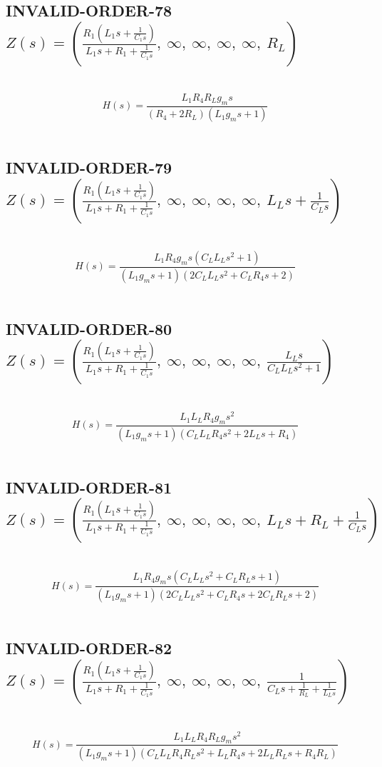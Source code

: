 \documentclass{article}
\begin{document}
\subsection{INVALID-ORDER-78 $Z(s) = \left( \frac{R_{1} \left(L_{1} s + \frac{1}{C_{1} s}\right)}{L_{1} s + R_{1} + \frac{1}{C_{1} s}}, \  \infty, \  \infty, \  \infty, \  \infty, \  R_{L}\right)$ } \ 
\textbf{\[H(s) = \frac{L_{1} R_{4} R_{L} g_{m} s}{\left(R_{4} + 2 R_{L}\right) \left(L_{1} g_{m} s + 1\right)}\] } \ 
\subsection{INVALID-ORDER-79 $Z(s) = \left( \frac{R_{1} \left(L_{1} s + \frac{1}{C_{1} s}\right)}{L_{1} s + R_{1} + \frac{1}{C_{1} s}}, \  \infty, \  \infty, \  \infty, \  \infty, \  L_{L} s + \frac{1}{C_{L} s}\right)$ } \ 
\textbf{\[H(s) = \frac{L_{1} R_{4} g_{m} s \left(C_{L} L_{L} s^{2} + 1\right)}{\left(L_{1} g_{m} s + 1\right) \left(2 C_{L} L_{L} s^{2} + C_{L} R_{4} s + 2\right)}\] } \ 
\subsection{INVALID-ORDER-80 $Z(s) = \left( \frac{R_{1} \left(L_{1} s + \frac{1}{C_{1} s}\right)}{L_{1} s + R_{1} + \frac{1}{C_{1} s}}, \  \infty, \  \infty, \  \infty, \  \infty, \  \frac{L_{L} s}{C_{L} L_{L} s^{2} + 1}\right)$ } \ 
\textbf{\[H(s) = \frac{L_{1} L_{L} R_{4} g_{m} s^{2}}{\left(L_{1} g_{m} s + 1\right) \left(C_{L} L_{L} R_{4} s^{2} + 2 L_{L} s + R_{4}\right)}\] } \ 
\subsection{INVALID-ORDER-81 $Z(s) = \left( \frac{R_{1} \left(L_{1} s + \frac{1}{C_{1} s}\right)}{L_{1} s + R_{1} + \frac{1}{C_{1} s}}, \  \infty, \  \infty, \  \infty, \  \infty, \  L_{L} s + R_{L} + \frac{1}{C_{L} s}\right)$ } \ 
\textbf{\[H(s) = \frac{L_{1} R_{4} g_{m} s \left(C_{L} L_{L} s^{2} + C_{L} R_{L} s + 1\right)}{\left(L_{1} g_{m} s + 1\right) \left(2 C_{L} L_{L} s^{2} + C_{L} R_{4} s + 2 C_{L} R_{L} s + 2\right)}\] } \ 
\subsection{INVALID-ORDER-82 $Z(s) = \left( \frac{R_{1} \left(L_{1} s + \frac{1}{C_{1} s}\right)}{L_{1} s + R_{1} + \frac{1}{C_{1} s}}, \  \infty, \  \infty, \  \infty, \  \infty, \  \frac{1}{C_{L} s + \frac{1}{R_{L}} + \frac{1}{L_{L} s}}\right)$ } \ 
\textbf{\[H(s) = \frac{L_{1} L_{L} R_{4} R_{L} g_{m} s^{2}}{\left(L_{1} g_{m} s + 1\right) \left(C_{L} L_{L} R_{4} R_{L} s^{2} + L_{L} R_{4} s + 2 L_{L} R_{L} s + R_{4} R_{L}\right)}\] } \ 
\end{document}

